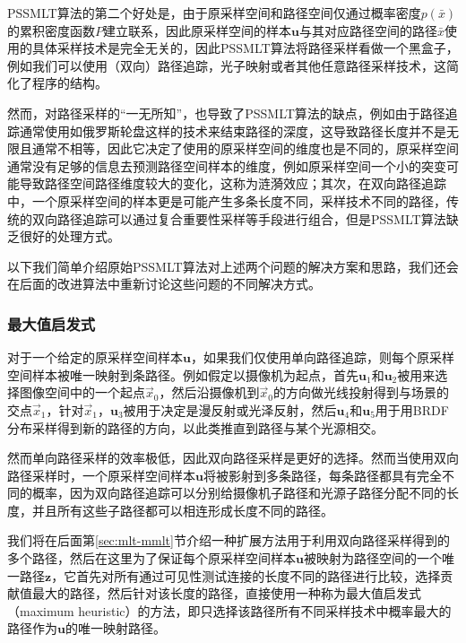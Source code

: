 PSSMLT算法的第二个好处是，由于原采样空间和路径空间仅通过概率密度$p(\bar{x})$的累积密度函数$P$建立联系，因此原采样空间的样本$\mathbf{u}$与其对应路径空间的路径$\bar{x}$使用的具体采样技术是完全无关的，因此PSSMLT算法将路径采样看做一个黑盒子，例如我们可以使用（双向）路径追踪，光子映射或者其他任意路径采样技术，这简化了程序的结构。

然而，对路径采样的“一无所知”，也导致了PSSMLT算法的缺点，例如由于路径追踪通常使用如俄罗斯轮盘这样的技术来结束路径的深度，这导致路径长度并不是无限且通常不相等，因此它决定了使用的原采样空间的维度也是不同的，原采样空间通常没有足够的信息去预测路径空间样本的维度，例如原采样空间一个小的突变可能导致路径空间路径维度较大的变化，这称为涟漪效应；其次，在双向路径追踪中，一个原采样空间的样本更是可能产生多条长度不同，采样技术不同的路径，传统的双向路径追踪可以通过复合重要性采样等手段进行组合，但是PSSMLT算法缺乏很好的处理方式。

以下我们简单介绍原始PSSMLT算法对上述两个问题的解决方案和思路，我们还会在后面的改进算法中重新讨论这些问题的不同解决方式。




\subsubsection{最大值启发式}\label{sec:mlt-maximum-heuristic}
对于一个给定的原采样空间样本$\mathbf{u}$，如果我们仅使用单向路径追踪，则每个原采样空间样本被唯一映射到条路径。例如假定以摄像机为起点，首先$\mathbf{u}_1$和$\mathbf{u}_2$被用来选择图像空间中的一个起点$\vec{x}_0$，然后沿摄像机到$\vec{x}_0$的方向做光线投射得到与场景的交点$\vec{x}_1$，针对$\vec{x}_1$，$\mathbf{u}_3$被用于决定是漫反射或光泽反射，然后$\mathbf{u}_4$和$\mathbf{u}_5$用于用BRDF分布采样得到新的路径的方向，以此类推直到路径与某个光源相交。

然而单向路径采样的效率极低，因此双向路径采样是更好的选择。然而当使用双向路径采样时，一个原采样空间样本$\mathbf{u}$将被影射到多条路径，每条路径都具有完全不同的概率，因为双向路径追踪可以分别给摄像机子路径和光源子路径分配不同的长度，并且所有这些子路径都可以相连形成长度不同的路径。

我们将在后面第\ref{sec:mlt-mmlt}节介绍一种扩展方法用于利用双向路径采样得到的多个路径，然后在这里为了保证每个原采样空间样本$\mathbf{u}$被映射为路径空间的一个唯一路径$\mathbf{z}$，它首先对所有通过可见性测试连接的长度不同的路径进行比较，选择贡献值最大的路径，然后针对该长度的路径，\cite{a:ASimpleandRobustMutationStrategyfortheMetropolisLightTransportAlgorithm}直接使用一种称为最大值启发式（maximum heuristic）的方法，即只选择该路径所有不同采样技术中概率最大的路径作为$\mathbf{u}$的唯一映射路径。



